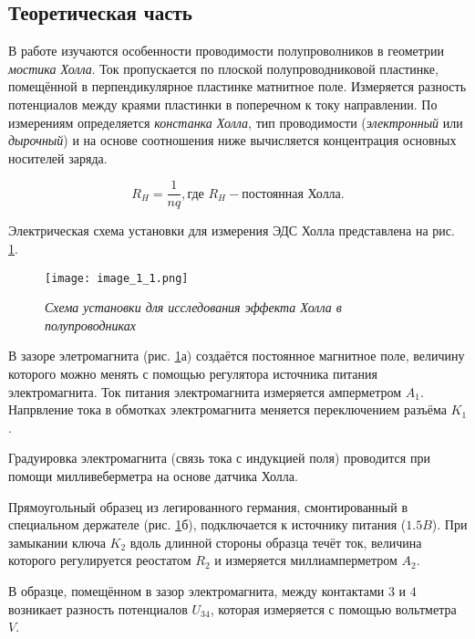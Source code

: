 \documentclass[a4paper,12pt]{article} %
\begin{document}
\subsection{Теоретическая часть}

\par
В работе изучаются особенности проводимости полупроволников в геометрии \textit{мостика Холла}. Ток пропускается по плоской полупроводниковой пластинке, помещённой в перпендикулярное пластинке матнитное поле. Измеряется разность потенциалов между краями пластинки в поперечном к току направлении. По измерениям определяется \textit{констанка Холла}, тип проводимости (\textit{электронный} или \textit{дырочный}) и на основе соотношения ниже вычисляется концентрация основных носителей заряда. \par

\[ R_H = \frac{1}{nq}, \text{где } R_H - \textit{постоянная Холла}. \]

Электрическая схема установки для измерения ЭДС Холла представлена на рис. \ref{img1}.

\begin{figure}[h]
\begin{center}
		\texttt{[image: image\_1\_1.png]}
\end{center}
	\caption{\textit{Схема установки для исследования эффекта Холла в полупроводниках}}
	\label{img1}
\end{figure}

В зазоре элетромагнита (рис. \ref{img1}а) создаётся постоянное магнитное поле, величину которого можно менять с помощью регулятора источника питания электромагнита. Ток питания электромагнита измеряется амперметром $A_1$. Напрвление тока в обмотках электромагнита меняется переключением разъёма $K_1$.\par

Градуировка электромагнита (связь тока с индукцией поля) проводится при помощи милливеберметра на основе датчика Холла.\par

Прямоугольный образец из легированного германия, смонтированный в специальном держателе (рис. \ref{img1}б), подключается к источнику питания ($1.5 B$). При замыкании ключа $K_2$ вдоль длинной стороны образца течёт ток, величина которого регулируется реостатом $R_2$ и измеряется миллиамперметром $A_2$.\par

В образце, помещённом в зазор электромагнита, между контактами $3$ и $4$ возникает разность потенциалов $U_{34}$, которая измеряется с помощью
вольтметра $V$.\par
\end{document}

